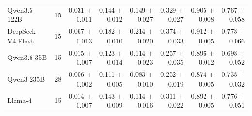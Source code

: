 \begin{table}[t]
\begin{tabular*}{\textwidth}{@{\extracolsep{\fill}}lrrrrrrr@{}}
Qwen3.5-122B & 15 & \shortstack[r]{0.031\\{\scriptsize $\pm$0.011}} & \shortstack[r]{0.144\\{\scriptsize $\pm$0.012}} & \shortstack[r]{0.149\\{\scriptsize $\pm$0.027}} & \shortstack[r]{0.329\\{\scriptsize $\pm$0.027}} & \shortstack[r]{0.905\\{\scriptsize $\pm$0.008}} & \shortstack[r]{0.767\\{\scriptsize $\pm$0.058}} \\
DeepSeek-V4-Flash & 15 & \shortstack[r]{0.067\\{\scriptsize $\pm$0.013}} & \shortstack[r]{0.182\\{\scriptsize $\pm$0.010}} & \shortstack[r]{0.214\\{\scriptsize $\pm$0.020}} & \shortstack[r]{0.374\\{\scriptsize $\pm$0.033}} & \shortstack[r]{0.912\\{\scriptsize $\pm$0.005}} & \shortstack[r]{0.778\\{\scriptsize $\pm$0.066}} \\
Qwen3.6-35B & 15 & \shortstack[r]{0.015\\{\scriptsize $\pm$0.007}} & \shortstack[r]{0.123\\{\scriptsize $\pm$0.014}} & \shortstack[r]{0.114\\{\scriptsize $\pm$0.023}} & \shortstack[r]{0.257\\{\scriptsize $\pm$0.035}} & \shortstack[r]{0.896\\{\scriptsize $\pm$0.012}} & \shortstack[r]{0.698\\{\scriptsize $\pm$0.052}} \\
Qwen3-235B & 28 & \shortstack[r]{0.006\\{\scriptsize $\pm$0.002}} & \shortstack[r]{0.111\\{\scriptsize $\pm$0.005}} & \shortstack[r]{0.083\\{\scriptsize $\pm$0.010}} & \shortstack[r]{0.252\\{\scriptsize $\pm$0.019}} & \shortstack[r]{0.874\\{\scriptsize $\pm$0.005}} & \shortstack[r]{0.738\\{\scriptsize $\pm$0.032}} \\
Llama-4 & 15 & \shortstack[r]{0.014\\{\scriptsize $\pm$0.007}} & \shortstack[r]{0.143\\{\scriptsize $\pm$0.009}} & \shortstack[r]{0.114\\{\scriptsize $\pm$0.016}} & \shortstack[r]{0.311\\{\scriptsize $\pm$0.022}} & \shortstack[r]{0.892\\{\scriptsize $\pm$0.005}} & \shortstack[r]{0.776\\{\scriptsize $\pm$0.051}} \\
\bottomrule
\end{tabular*}
\end{table}
